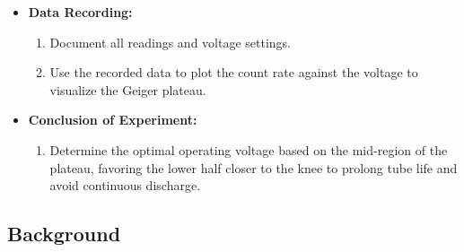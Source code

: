 \documentclass[11pt]{article}
\begin{document}
\begin{itemize}
		\item \textbf{Data Recording:}
		\begin{enumerate}
			\item Document all readings and voltage settings.
			\item Use the recorded data to plot the count rate against the voltage to visualize the Geiger plateau.
		\end{enumerate}
		
		\item \textbf{Conclusion of Experiment:}
		\begin{enumerate}
			\item Determine the optimal operating voltage based on the mid-region of the plateau, favoring the lower half closer to the knee to prolong tube life and avoid continuous discharge.
		\end{enumerate}
		
	\end{itemize}	
	
	\subsection{Background}
	
\end{document}
